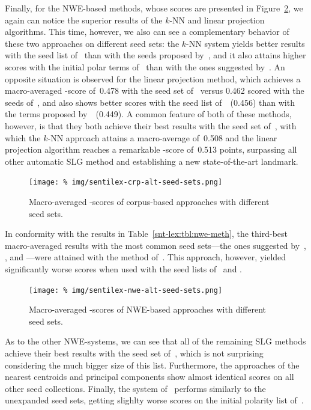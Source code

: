 Finally, for the NWE-based methods, whose scores are presented in
Figure~\ref{snt:fig:sent-nwe-lex-alt-seeds}, we again can notice the
superior results of the $k$-NN and linear projection algorithms.  This
time, however, we also can see a complementary behavior of these two
approaches on different seed sets: the $k$-NN system yields better
results with the seed list of~\citet{Turney:03} than with the seeds
proposed by~\citet{Hu:04}, and it also attains higher scores with the
initial polar terms of~\citet{Remus:10} than with the ones suggested
by~\citet{Esuli:05}.  An opposite situation is observed for the linear
projection method, which achieves a macro-averaged \F-score of~0.478
with the seed set of~\citet{Hu:04} versus 0.462 scored with the seeds
of~\citet{Turney:03}, and also shows better scores with the seed list
of~\citet{Esuli:05}~(0.456) than with the terms proposed
by~\citet{Remus:10}~(0.449).  A common feature of both of these
methods, however, is that they both achieve their best results with
the seed set of~\citet{Kim:04}, with which the $k$-NN approach attains
a macro-average of~0.508 and the linear projection algorithm reaches a
remarkable \F-score of~0.513 points, surpassing all other automatic
SLG method and establishing a new state-of-the-art landmark.

\begin{figure}[hbtp]
  \centering
  \texttt{[image: \%
    img/sentilex-crp-alt-seed-sets.png]}
  \caption{Macro-averaged \F{}-scores of corpus-based approaches with
    different seed sets.}\label{snt:fig:sent-crp-lex-alt-seeds}
\end{figure}

In conformity with the results in Table~\ref{snt-lex:tbl:nwe-meth},
the third-best macro-averaged results with the most common seed
sets---the ones suggested by~\citet{Turney:03}, \citet{Hu:04}, and
\citet{Kim:04}---were attained with the method of~\citet{Tang:16}.
This approach, however, yielded significantly worse scores when used
with the seed lists of~\citet{Esuli:05} and \citet{Remus:10}.

\begin{figure}[hbtp]
  \centering
  \texttt{[image: \%
    img/sentilex-nwe-alt-seed-sets.png]}
  \caption{Macro-averaged \F{}-scores of NWE-based approaches with
    different seed sets.}\label{snt:fig:sent-nwe-lex-alt-seeds}
\end{figure}

As to the other NWE-systems, we can see that all of the remaining SLG
methods achieve their best results with the seed set
of~\citet{Kim:04}, which is not surprising considering the much bigger
size of this list.  Furthermore, the approaches of the nearest
centroids and principal components show almost identical scores on all
other seed collections.  Finally, the system of~\citet{Vo:16} performs
similarly to the unexpanded seed sets, getting slighlty worse scores
on the initial polarity list of~\citet{Turney:03}.

